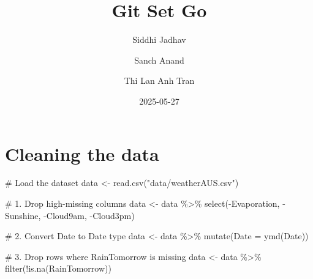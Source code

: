 \documentclass[
  letterpaper,
  DIV=11,
  numbers=noendperiod]{scrartcl}
\title{Git Set Go}
\author{Siddhi Jadhav \and Sanch Anand \and Thi Lan Anh Tran}
\date{2025-05-27}
\newenvironment{Shaded}{\begin{snugshade}}{\end{snugshade}}
\newcommand{\AttributeTok}[1]{\textcolor[rgb]{0.40,0.45,0.13}{#1}}
\newcommand{\CommentTok}[1]{\textcolor[rgb]{0.37,0.37,0.37}{#1}}
\newcommand{\FunctionTok}[1]{\textcolor[rgb]{0.28,0.35,0.67}{#1}}
\newcommand{\NormalTok}[1]{\textcolor[rgb]{0.00,0.23,0.31}{#1}}
\newcommand{\OtherTok}[1]{\textcolor[rgb]{0.00,0.23,0.31}{#1}}
\newcommand{\SpecialCharTok}[1]{\textcolor[rgb]{0.37,0.37,0.37}{#1}}
\newcommand{\StringTok}[1]{\textcolor[rgb]{0.13,0.47,0.30}{#1}}
\renewcommand*\contentsname{Table of contents}
\newcommand\contentsname{Table of contents}
\begin{document}
\maketitle

\renewcommand*\contentsname{Table of contents}
{
\hypersetup{linkcolor=}
\setcounter{tocdepth}{2}
\tableofcontents
}

\section{Cleaning the data}\label{cleaning-the-data}

\begin{Shaded}
\begin{Highlighting}[]
\CommentTok{\# Load the dataset}
\NormalTok{data }\OtherTok{\textless{}{-}} \FunctionTok{read.csv}\NormalTok{(}\StringTok{"data/weatherAUS.csv"}\NormalTok{)}
\end{Highlighting}
\end{Shaded}

\begin{Shaded}
\begin{Highlighting}[]
\CommentTok{\# 1. Drop high{-}missing columns}
\NormalTok{data }\OtherTok{\textless{}{-}}\NormalTok{ data }\SpecialCharTok{\%\textgreater{}\%}
  \FunctionTok{select}\NormalTok{(}\SpecialCharTok{{-}}\NormalTok{Evaporation, }\SpecialCharTok{{-}}\NormalTok{Sunshine, }\SpecialCharTok{{-}}\NormalTok{Cloud9am, }\SpecialCharTok{{-}}\NormalTok{Cloud3pm)}
\end{Highlighting}
\end{Shaded}

\begin{Shaded}
\begin{Highlighting}[]
\CommentTok{\# 2. Convert \textquotesingle{}Date\textquotesingle{} to Date type}
\NormalTok{data }\OtherTok{\textless{}{-}}\NormalTok{ data }\SpecialCharTok{\%\textgreater{}\%}
  \FunctionTok{mutate}\NormalTok{(}\AttributeTok{Date =} \FunctionTok{ymd}\NormalTok{(Date))}
\end{Highlighting}
\end{Shaded}

\begin{Shaded}
\begin{Highlighting}[]
\CommentTok{\# 3. Drop rows where \textquotesingle{}RainTomorrow\textquotesingle{} is missing}
\NormalTok{data }\OtherTok{\textless{}{-}}\NormalTok{ data }\SpecialCharTok{\%\textgreater{}\%}
  \FunctionTok{filter}\NormalTok{(}\SpecialCharTok{!}\FunctionTok{is.na}\NormalTok{(RainTomorrow))}
\end{Highlighting}
\end{Shaded}
\end{document}
